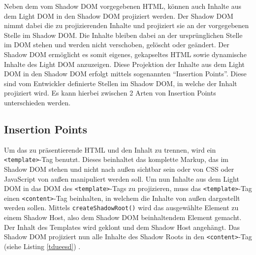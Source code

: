 Neben dem vom Shadow \ac{DOM} vorgegebenen \ac{HTML}, können auch Inhalte aus dem Light \ac{DOM} in den Shadow \ac{DOM} projiziert werden. Der Shadow \ac{DOM} nimmt dabei die zu projizierenden Inhalte und projiziert sie an der vorgegebenen Stelle im Shadow \ac{DOM}. Die Inhalte bleiben dabei an der ursprünglichen Stelle im \ac{DOM} stehen und werden nicht verschoben, gelöscht oder geändert. Der Shadow \ac{DOM} ermöglicht es somit eigenes, gekapseltes \ac{HTML} sowie dynamische Inhalte des Light \ac{DOM} anzuzeigen. Diese Projektion der Inhalte aus dem Light \ac{DOM} in den Shadow \ac{DOM} erfolgt mittels sogenannten ``Insertion Points''. Diese sind vom Entwickler definierte Stellen im Shadow \ac{DOM}, in welche der Inhalt projiziert wird. Es kann hierbei zwischen 2 Arten von Insertion Points unterschieden werden.

\subsection{Insertion Points}\label{insertion-points}

Um das zu präsentierende \ac{HTML} und den Inhalt zu trennen, wird ein \texttt{\textless{}template\textgreater{}}-Tag benutzt. Dieses beinhaltet das komplette Markup, das im Shadow \ac{DOM} stehen und nicht nach außen sichtbar sein oder von \ac{CSS} oder JavaScript von außen manipuliert werden soll. Um nun Inhalte aus dem Light \ac{DOM} in das \ac{DOM} des \texttt{\textless{}template\textgreater{}}-Tags zu projizieren, muss das \texttt{\textless{}template\textgreater{}}-Tag einen \texttt{\textless{}content\textgreater{}}-Tag beinhalten, in welchem die Inhalte von außen dargestellt werden sollen. Mittels \texttt{createShadowRoot()} wird das ausgewählte Element zu einem Shadow Host, also dem Shadow \ac{DOM} beinhaltendem Element gemacht. Der Inhalt des Templates wird geklont und dem Shadow Host angehängt. Das Shadow \ac{DOM} projiziert nun alle Inhalte des Shadow Roots in den \texttt{\textless{}content\textgreater{}}-Tag (siehe Listing \ref{tdueesd}) \cite{citeulike:13851404}.



